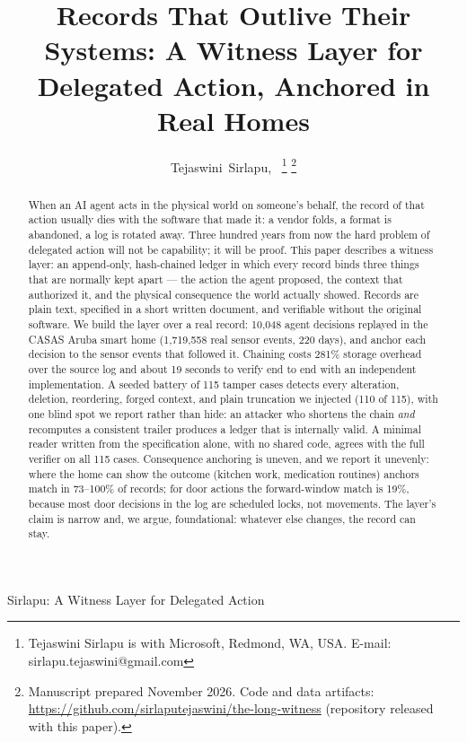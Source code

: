\documentclass[journal]{IEEEtran}
\begin{document}
\title{Records That Outlive Their Systems: A Witness Layer for Delegated Action, Anchored in Real Homes}

\author{Tejaswini~Sirlapu,~
\thanks{Tejaswini Sirlapu is with Microsoft, Redmond, WA, USA.
E-mail: sirlapu.tejaswini@gmail.com}
\thanks{Manuscript prepared November 2026. Code and data artifacts:
\url{https://github.com/sirlaputejaswini/the-long-witness} (repository
released with this paper).}}

%
{Sirlapu: A Witness Layer for Delegated Action}

\maketitle

\begin{abstract}
When an AI agent acts in the physical world on someone's behalf, the
record of that action usually dies with the software that made it: a
vendor folds, a format is abandoned, a log is rotated away. Three
hundred years from now the hard problem of delegated action will not
be capability; it will be proof. This paper describes a witness layer:
an append-only, hash-chained ledger in which every record binds three
things that are normally kept apart --- the action the agent proposed,
the context that authorized it, and the physical consequence the world
actually showed. Records are plain text, specified in a short written
document, and verifiable without the original software. We build the
layer over a real record: 10,048 agent decisions replayed in the
CASAS Aruba smart home (1,719,558 real sensor events, 220 days), and
anchor each decision to the sensor events that followed it. Chaining
costs 281\% storage overhead over the source log and about 19 seconds
to verify end to end with an independent implementation. A seeded battery of
115 tamper cases detects every alteration, deletion, reordering,
forged context, and plain truncation we injected (110 of 115), with
one blind spot we report rather than hide: an attacker who shortens
the chain \emph{and} recomputes a consistent trailer produces a
ledger that is internally valid. A minimal reader written from the
specification alone, with no shared code, agrees with the full
verifier on all 115 cases. Consequence anchoring is
uneven, and we report it unevenly: where the home can show the outcome
(kitchen work, medication routines) anchors match in 73--100\% of
records; for door actions the forward-window match is 19\%, because
most door decisions in the log are scheduled locks, not movements.
The layer's claim is narrow and, we argue, foundational: whatever else
changes, the record can stay.
\end{abstract}
\end{document}
